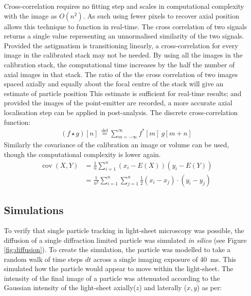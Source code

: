 Cross-correlation requires no fitting step and scales in computational complexity with the image as $O(n^2)$. %
As such using fewer pixels%
to recover axial position allows this technique to function in real-time.
The cross correlation of two signals returns a single value representing an unnormalised similarity of the two signals.
Provided the astigmatism is transitioning linearly, a cross-correlation for every image in the calibrated stack may not be needed.
By using all the images in the calibration stack, the computational time increases by the half the number of axial images in that stack.
The ratio of the the cross correlation of two images spaced axially and equally about the focal centre of the stack will give an estimate of particle position
This estimate is sufficient for real-time results; and provided the images of the point-emitter are recorded, a more accurate axial localisation step can be applied in post-analysis.
The discrete cross-correlation function:
\begin{align}
(f \star g)[n]\ \stackrel{\mathrm{def}}{=} \sum_{m=-\infty}^{\infty} f^*[m]\ g[m+n]
\end{align}
Similarly the covariance of the calibration an image or volume can be used, though the computational complexity is lower again.
\begin{align}
  \operatorname{cov}(X,Y) &=\frac{1}{n}\sum_{i=1}^n (x_i-E(X))(y_i-E(Y)) \\
 &= \frac{1}{n^2} \sum_{i=1}^n \sum_{j=1}^n \frac{1}{2}(x_i - x_j)\cdot(y_i - y_j)
\end{align}

\subsection{Simulations}
To verify that single particle tracking in light-sheet microscopy was possible, the diffusion of a single diffraction limited particle was simulated \emph{in silico} (see Figure \ref{fig:diffusion}).
To create the simulation, the particle was modelled to take a random walk of time steps $dt$ across a single imaging exposure of \SI{40}{\milli\second}.
This simulated how the particle would appear to move within the light-sheet.
The intensity of the final image of a particle was attenuated according to the Gaussian intensity of the light-sheet axially($z$) and laterally ($x,y$) as per:

